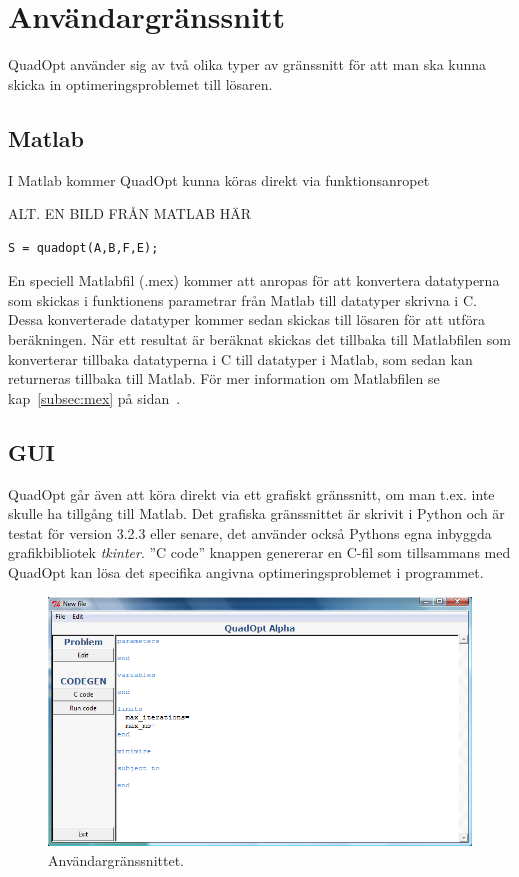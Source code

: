 \section{Användargränssnitt}
QuadOpt använder sig av två olika typer av gränssnitt för att man ska kunna skicka in optimeringsproblemet till lösaren.

\subsection{Matlab}
I Matlab kommer QuadOpt kunna köras direkt via funktionsanropet

ALT. EN BILD FRÅN MATLAB HÄR

\begin{lstlisting}
S = quadopt(A,B,F,E);
\end{lstlisting}
En speciell Matlabfil (.mex) kommer att anropas för att konvertera datatyperna som skickas i funktionens parametrar från Matlab till datatyper skrivna i C. Dessa konverterade datatyper kommer sedan skickas till lösaren för att utföra beräkningen. När ett resultat är beräknat skickas det tillbaka till Matlabfilen som konverterar tillbaka datatyperna i C till datatyper i Matlab, som sedan kan returneras tillbaka till Matlab.
För mer information om Matlabfilen se kap~\ref{subsec:mex} på sidan~\pageref{subsec:mex}.

\subsection{GUI}
QuadOpt går även att köra direkt via ett grafiskt gränssnitt, om man t.ex. inte skulle ha tillgång till Matlab. Det grafiska gränssnittet är skrivit i Python och är testat för version 3.2.3 eller senare, det använder också Pythons egna inbyggda grafikbibliotek \emph{tkinter}. ''C code'' knappen genererar en C-fil som tillsammans med QuadOpt kan lösa det specifika angivna optimeringsproblemet i programmet.

\begin{figure}[h]
	\begin{center}
		\includegraphics[scale=0.5]{bilder/gui.png}
	\end{center}
	\caption{Användargränssnittet.}
\end{figure}

